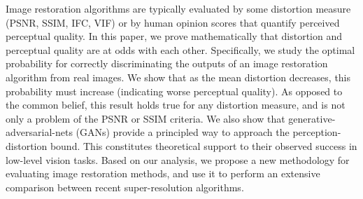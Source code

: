 
Image restoration algorithms are typically evaluated by some distortion measure (\eg PSNR, SSIM, IFC, VIF) or by human opinion scores that quantify perceived perceptual quality. In this paper, we prove mathematically that distortion and perceptual quality are at odds with each other. Specifically, we study the optimal probability for correctly discriminating the outputs of an image restoration algorithm from real images. We show that as the mean distortion decreases, this probability must increase (indicating worse perceptual quality). As opposed to the common belief, this result holds true for any distortion measure, and is not only a problem of the PSNR or SSIM criteria. We also show that generative-adversarial-nets (GANs) provide a principled way to approach the perception-distortion bound. This constitutes theoretical support to their observed success in low-level vision tasks. Based on our analysis, we propose a new methodology for evaluating image restoration methods, and use it to perform an extensive comparison between recent super-resolution algorithms.

